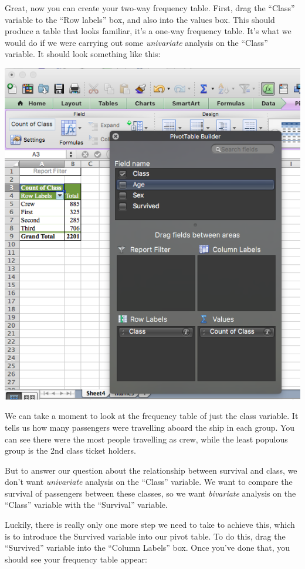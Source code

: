 \documentclass[
]{book}
\begin{document}
Great, now you can create your two-way frequency table. First, drag the ``Class'' variable to the ``Row labels'' box, and also into the values box. This should produce a table that looks familiar, it's a one-way frequency table. It's what we would do if we were carrying out some \emph{univariate} analysis on the ``Class'' variable. It should look something like this:

\includegraphics{imgs/class_uni.png}

We can take a moment to look at the frequency table of just the class variable. It tells us how many passengers were travelling aboard the ship in each group. You can see there were the most people travelling as crew, while the least populous group is the 2nd class ticket holders.

But to answer our question about the relationship between survival and class, we don't want \emph{univariate} analysis on the ``Class'' variable. We want to compare the survival of passengers between these classes, so we want \emph{bivariate} analysis on the ``Class'' variable with the ``Survival'' variable.

Luckily, there is really only one more step we need to take to achieve this, which is to introduce the Survived variable into our pivot table. To do this, drag the ``Survived'' variable into the ``Column Labels'' box. Once you've done that, you should see your frequency table appear:
\end{document}
